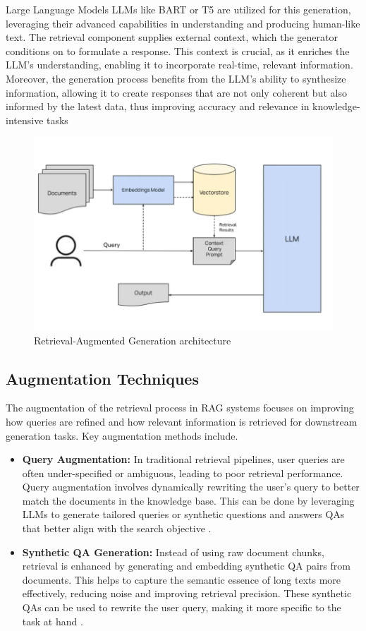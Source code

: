 Large Language Models LLMs like BART or T5 are utilized for this generation, leveraging their advanced capabilities in understanding and producing human-like text. The retrieval component supplies external context, which the generator conditions on to formulate a response. This context is crucial, as it enriches the LLM's understanding, enabling it to incorporate real-time, relevant information\citep{gupta2024comprehensive}. Moreover, the generation process benefits from the LLM's ability to synthesize information, allowing it to create responses that are not only coherent but also informed by the latest data, thus improving accuracy and relevance in knowledge-intensive tasks  \\
\begin{figure}[h]
	\centering
	\includegraphics[width=0.9\linewidth]{Figures/rag_architectur.png}
	\caption{Retrieval-Augmented Generation architecture}
	\label{rag_architectur.png}
\end{figure}

\subsection{Augmentation Techniques}
The augmentation of the retrieval process in RAG systems focuses on improving how queries are refined and how relevant information is retrieved for downstream generation tasks. Key augmentation methods include.
\begin{itemize}
	\item \textbf{Query Augmentation:} In traditional retrieval pipelines, user queries are often under-specified or ambiguous, leading to poor retrieval performance. Query augmentation involves dynamically rewriting the user's query to better match the documents in the knowledge base\citep{mombaerts2024meta}. This can be done by leveraging LLMs to generate tailored queries or synthetic questions and answers QAs that better align with the search objective​ .
	\item \textbf{Synthetic QA Generation:} Instead of using raw document chunks, retrieval is enhanced by generating and embedding synthetic QA pairs from documents\citep{mombaerts2024meta}. This helps to capture the semantic essence of long texts more effectively, reducing noise and improving retrieval precision. These synthetic QAs can be used to rewrite the user query, making it more specific to the task at hand .
\end{itemize}

